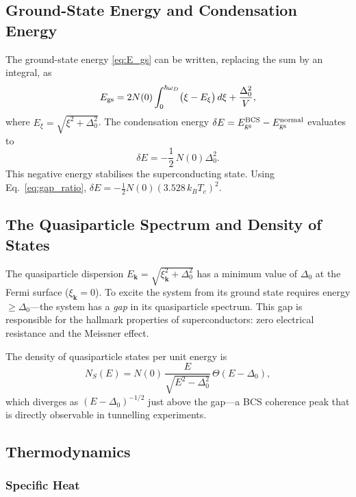\subsection{Ground-State Energy and Condensation Energy}

The ground-state energy \eqref{eq:E_gs} can be written, replacing the sum by an
integral, as
\begin{equation}
	E_{\rm gs} = 2N(0)\int_0^{\hbar\omega_D}
	\bigl(\xi - E_\xi\bigr)\, d\xi + \frac{\Delta_0^2}{V},
\end{equation}
where $E_\xi = \sqrt{\xi^2 + \Delta_0^2}$. The condensation energy
$\delta E = E_{\rm gs}^{\rm BCS} - E_{\rm gs}^{\rm normal}$ evaluates to
\begin{equation}
	\delta E = -\frac{1}{2}\,N(0)\Delta_0^2.
	\label{eq:condensation_energy}
\end{equation}
This negative energy stabilises the superconducting state. Using
Eq.~\eqref{eq:gap_ratio}, $\delta E = -\frac{1}{2}N(0)(3.528\, k_B T_c)^2$.

\subsection{The Quasiparticle Spectrum and Density of States}

The quasiparticle dispersion $E_{\mathbf{k}} = \sqrt{\xi_{\mathbf{k}}^2 +
	\Delta_0^2}$ has a minimum value of $\Delta_0$ at the Fermi surface
($\xi_{\mathbf{k}} = 0$). To excite the system from its ground state requires
energy $\geq \Delta_0$---the system has a \emph{gap} in its quasiparticle
spectrum. This gap is responsible for the hallmark properties of
superconductors: zero electrical resistance and the Meissner effect.

The density of quasiparticle states per unit energy is
\begin{equation}
	N_S(E) = N(0)\,\frac{E}{\sqrt{E^2 - \Delta_0^2}}\,\Theta(E - \Delta_0),
	\label{eq:DOS}
\end{equation}
which diverges as $(E-\Delta_0)^{-1/2}$ just above the gap---a BCS coherence
peak that is directly observable in tunnelling experiments.

\subsection{Thermodynamics}

\subsubsection{Specific Heat}

